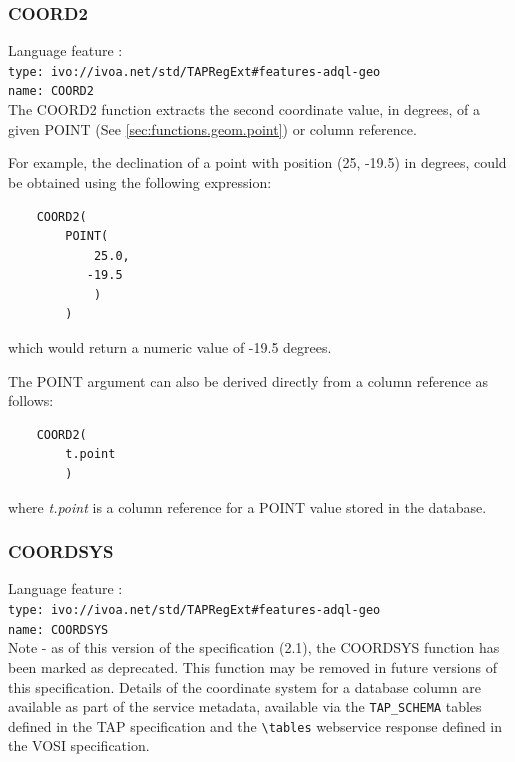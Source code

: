 \documentclass[11pt,a4paper]{ivoa}
\newcommand{\TAPspec}  {TAP specification\xspace}
\newcommand{\VOSIspec} {VOSI specification\xspace}
\begin{document}
\subsubsection{COORD2}
\label{sec:functions.geom.coord2}
{\footnotesize Language feature :}\\
{\footnotesize \verb|type: ivo://ivoa.net/std/TAPRegExt#features-adql-geo|}\\
{\footnotesize \verb|name: COORD2|}\\

The COORD2 function extracts the second coordinate value, in degrees, of a given
POINT (See \ref{sec:functions.geom.point}) or column reference.

For example, the declination of a point with position (25, -19.5) in degrees,
could be obtained using the following expression:
\begin{verbatim}
    COORD2(
        POINT(
            25.0,
           -19.5
            )
        )
\end{verbatim}
\noindent
which would return a numeric value of -19.5 degrees.

The POINT argument can also be derived directly from a column
reference as follows:
\begin{verbatim}
    COORD2(
        t.point
        )
\end{verbatim}
\noindent
where \textit{t.point} is a column reference for a POINT value
stored in the database.

\subsubsection{COORDSYS}
\label{sec:functions.geom.coordsys}
{\footnotesize Language feature :}\\
{\footnotesize \verb|type: ivo://ivoa.net/std/TAPRegExt#features-adql-geo|}\\
{\footnotesize \verb|name: COORDSYS|}\\

Note - as of this version of the specification (2.1), the COORDSYS function has
been marked as deprecated. This function may be removed in future versions
of this specification.
Details of the coordinate system for a database column are available as part of
the service metadata, available via the \verb:TAP_SCHEMA: tables defined in the
\TAPspec and the \verb:\tables: webservice response defined in the \VOSIspec.

\end{document}
